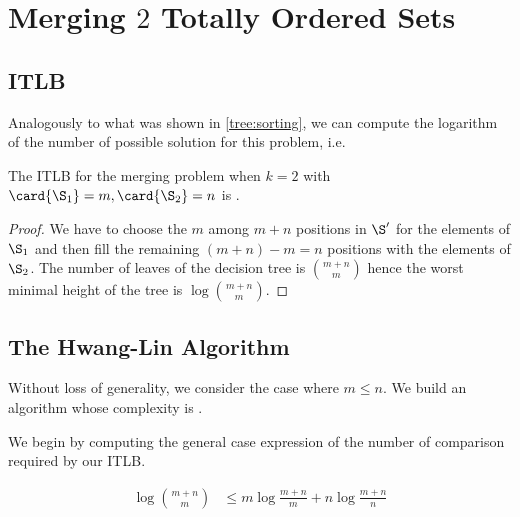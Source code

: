 \section{Merging \(2\) Totally Ordered Sets}
\label{tree:merging:k=2}

\subsection*{ITLB}
\label{tree:merging:k=2:ITLB}

Analogously to what was shown in \ref{tree:sorting}, we can compute the
logarithm of the number of possible solution for this problem, i.e.

\begin{theorem}
The ITLB for the merging problem when \(k = 2\) with \(\card{\S_1} = m, \card{\S_2}
= n\) is .
\end{theorem}

\begin{proof}
We have to choose the $m$ among $m+n$ positions in $\S'$ for the elements of
$\S_1$ and then fill the remaining $(m+n) - m = n$ positions with the elements
of $\S_2$. The number of leaves of the decision tree is $\binom{m+n}{m}$ hence
the worst minimal height of the tree is $\log \binom{m+n}{m}$.
\end{proof}



\subsection*{The Hwang-Lin Algorithm}
\label{tree:merging:k=2:alg}

Without loss of generality, we consider the case where $m \leq n$. We build an
algorithm whose complexity is .


We begin by computing the general case expression of the number of comparison
required by our ITLB.


\begin{lemma}
\begin{align*}
\log\binom{m+n}{m} &\leq m \log\frac{m+n}{m} + n \log\frac{m+n}{n}\\
\end{align*}
\end{lemma}


